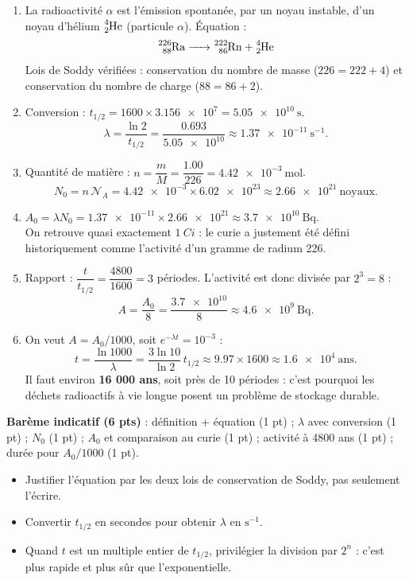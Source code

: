 \documentclass[11pt]{article}
\newcommand{\cle}[1]{{\popxbold\color{popdark}#1}}
\begin{document}
\begin{corrige}
\begin{enumerate}
\item La radioactivité \cle{$\alpha$} est l'émission spontanée, par un noyau instable, d'un noyau d'hélium $\ce{^{4}_{2}He}$ (particule $\alpha$). Équation :
\[ \ce{^{226}_{88}Ra -> ^{222}_{86}Rn + ^{4}_{2}He} \]
Lois de Soddy vérifiées : conservation du nombre de masse ($226 = 222 + 4$) et conservation du nombre de charge ($88 = 86 + 2$).
\item Conversion : $t_{1/2} = \num{1600} \times \num{3,156e7} = \num{5,05e10}\ \mathrm{s}$.
\[ \lambda = \frac{\ln 2}{t_{1/2}} = \frac{\num{0,693}}{\num{5,05e10}} \approx \num{1,37e-11}\ \mathrm{s^{-1}}. \]
\item Quantité de matière : $n = \dfrac{m}{M} = \dfrac{\num{1,00}}{\num{226}} = \num{4,42e-3}\ \mathrm{mol}$.
\[ N_0 = n\,\mathcal{N}_A = \num{4,42e-3} \times \num{6,02e23} \approx \num{2,66e21}\ \text{noyaux}. \]
\item $A_0 = \lambda N_0 = \num{1,37e-11} \times \num{2,66e21} \approx \num{3,7e10}\ \mathrm{Bq}$. \\
On retrouve quasi exactement $\SI{1}{Ci}$ : le curie a justement été défini historiquement comme l'activité d'un gramme de radium 226.
\item Rapport : $\dfrac{t}{t_{1/2}} = \dfrac{\num{4800}}{\num{1600}} = 3$ périodes. L'activité est donc divisée par $2^{3} = 8$ :
\[ A = \frac{A_0}{8} = \frac{\num{3,7e10}}{8} \approx \num{4,6e9}\ \mathrm{Bq}. \]
\item On veut $A = A_0/1000$, soit $e^{-\lambda t} = 10^{-3}$ :
\[ t = \frac{\ln 1000}{\lambda} = \frac{3\ln 10}{\ln 2}\,t_{1/2} \approx \num{9,97} \times \num{1600} \approx \num{1,6e4}\ \text{ans}. \]
Il faut environ \textbf{16 000 ans}, soit près de 10 périodes : c'est pourquoi les déchets radioactifs à vie longue posent un problème de stockage durable.
\end{enumerate}
\textbf{Barème indicatif (6 pts)} : définition + équation (1 pt) ; $\lambda$ avec conversion (1 pt) ; $N_0$ (1 pt) ; $A_0$ et comparaison au curie (1 pt) ; activité à 4800 ans (1 pt) ; durée pour $A_0/1000$ (1 pt).
\end{corrige}
\begin{attention}
\begin{itemize}
\item Justifier l'équation par les deux lois de conservation de Soddy, pas seulement l'écrire.
\item Convertir $t_{1/2}$ en secondes pour obtenir $\lambda$ en $\mathrm{s^{-1}}$.
\item Quand $t$ est un multiple entier de $t_{1/2}$, privilégier la division par $2^{n}$ : c'est plus rapide et plus sûr que l'exponentielle.
\end{itemize}
\end{attention}
\end{document}

